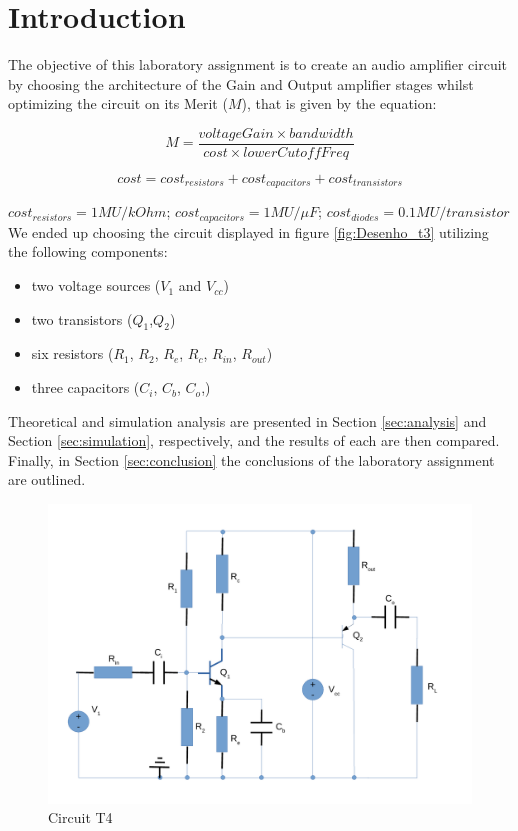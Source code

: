 
\section{Introduction}
\label{sec:introduction}



The objective of this laboratory assignment is to create an audio amplifier circuit by choosing the architecture of the Gain and Output amplifier stages whilst optimizing the circuit on its Merit ($M$), that is given by the equation:

\[
M = \frac{voltageGain\times bandwidth}{cost\times lowerCutoffFreq}
\]

\[
 cost = cost_{resistors} + cost_{capacitors} + cost_{transistors} 
\]

$cost_{resistors} = 1MU/kOhm$; $cost_{capacitors} = 1MU/\mu F$;
$cost_{diodes} = 0.1MU/transistor$ \\

We ended up choosing the circuit displayed in figure \ref{fig:Desenho_t3} utilizing the following components:

\begin{itemize}
	\item two voltage sources ($V_1$ and $V_{cc}$)
	\item two transistors ($Q_1$,$Q_2$)
	\item six resistors ($R_1$, $R_2$, $R_e$, $R_c$, $R_{in}$, $R_{out}$)
	\item three capacitors ($C_i$, $C_b$, $C_o$,)
\end{itemize}


Theoretical and simulation analysis are presented in Section \ref{sec:analysis} and Section \ref{sec:simulation}, respectively, and the results of each are then compared.
Finally, in Section \ref{sec:conclusion} the conclusions of the laboratory assignment are outlined. 



\begin{figure}[h]
	\centering
	\includegraphics[width=0.85\linewidth]{dsnh_t4.pdf}
	\caption{Circuit T4}
\label{fig:Desenho_t4}
\end{figure}


